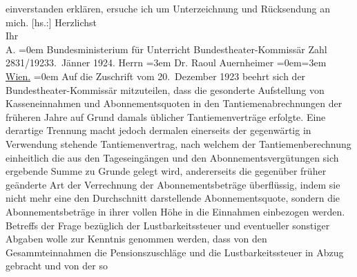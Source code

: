 \begin{ledgroupsized}[t]{13cm}
               einverstanden erklären, ersuche ich um Unterzeichnung und Rücksendung an mich.\pend
           \pstart
           {[}hs.:{]} Herzlichst{\\[\baselineskip]}Ihr{\\[\baselineskip]}\spacefill\mbox{A.}\pend
           \leftskip=0em{}{\bigskip}\pstart
           \noindent{}\raggedleft{}{\pb}Bundesministerium für Unterricht\pend
           \pstart
           \noindent{}\raggedleft{}Bundestheater-Kommissär\pend
           \pstart
           \noindent{}Zahl 2831/1923\hfill 3. Jänner 1924.\pend
           \pstart
           Herrn\pend
           \leftskip=3em{}\pstart
           \noindent{}Dr. Raoul Auernheimer\pend
           \leftskip=0em{}\leftskip=3em{}\pstart
           \uline{Wien.}\pend
           \leftskip=0em{}\pstart
           Auf die Zuschrift vom 20. Dezember 1923 beehrt sich der Bundestheater-Kommissär
               mitzuteilen, dass die gesonderte Aufstellung von Kasseneinnahmen und
               Abonnementsquoten in den Tantiemenabrechnungen der früheren Jahre auf Grund damals
               üblicher Tantiemenverträge erfolgte. Eine derartige Trennung macht jedoch dermalen
               einerseits der gegenwärtig in Verwendung stehende Tantiemenvertrag, nach welchem der
               Tantiemenberechnung einheitlich die aus den Tageseingängen und den
               Abonnementsvergütungen sich ergebende Summe zu Grunde gelegt wird, andererseits die
               gegenüber früher geänderte Art der Verrechnung der Abonnementsbeträge überflüssig,
                  {\pb}indem sie nicht mehr eine den Durchschnitt
               darstellende  Abonnementsquote, sondern die
               Abonnementsbeträge in ihrer vollen Höhe in die Einnahmen einbezogen werden.\pend
           \pstart
           Betreffs der Frage bezüglich der Lustbarkeitssteuer und eventueller sonstiger Abgaben
               wolle zur Kenntnis genommen werden, dass von den Gesammteinnahmen die
               Pensionszuschläge und die Lustbarkeitssteuer in Abzug gebracht und von der so

\end{ledgroupsized}
